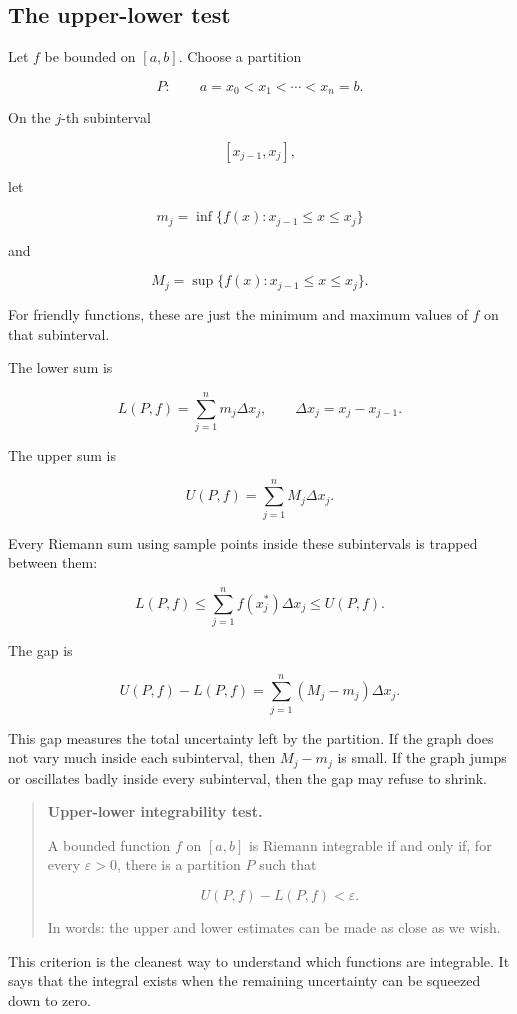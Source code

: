 \subsection{The upper-lower test}
\label{subsec:upper-lower-test-integrability}

Let \(f\) be bounded on \([a,b]\).  Choose a partition

\[
P:\qquad a=x_0<x_1<\cdots<x_n=b.
\]

On the \(j\)-th subinterval

\[
[x_{j-1},x_j],
\]

let

\[
m_j=\inf\{f(x):x_{j-1}\le x\le x_j\}
\]

and

\[
M_j=\sup\{f(x):x_{j-1}\le x\le x_j\}.
\]

For friendly functions, these are just the minimum and maximum values of \(f\) on
that subinterval.

The lower sum is

\[
L(P,f)=\sum_{j=1}^{n}m_j\Delta x_j,
\qquad
\Delta x_j=x_j-x_{j-1}.
\]

The upper sum is

\[
U(P,f)=\sum_{j=1}^{n}M_j\Delta x_j.
\]

Every Riemann sum using sample points inside these subintervals is trapped between
them:

\[
L(P,f)\le
\sum_{j=1}^{n}f(x_j^*)\Delta x_j
\le U(P,f).
\]

The gap is

\[
U(P,f)-L(P,f)
=
\sum_{j=1}^{n}(M_j-m_j)\Delta x_j.
\]

This gap measures the total uncertainty left by the partition.  If the graph does not
vary much inside each subinterval, then \(M_j-m_j\) is small.  If the graph jumps
or oscillates badly inside every subinterval, then the gap may refuse to shrink.

\begin{quote}
\textbf{Upper-lower integrability test.}

A bounded function \(f\) on \([a,b]\) is Riemann integrable if and only if, for every
\(\varepsilon>0\), there is a partition \(P\) such that

\[
\boxed{
U(P,f)-L(P,f)<\varepsilon.
}
\]

In words: the upper and lower estimates can be made as close as we wish.
\end{quote}

This criterion is the cleanest way to understand which functions are integrable.  It says
that the integral exists when the remaining uncertainty can be squeezed down to zero.

